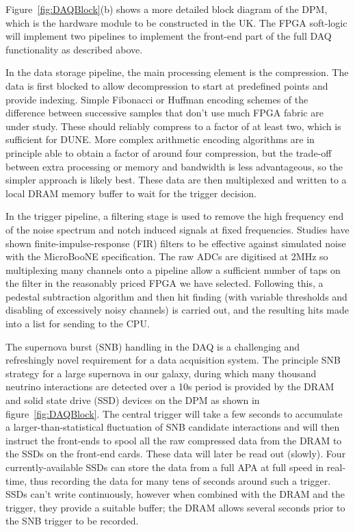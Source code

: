 Figure~\ref{fig:DAQBlock}(b) shows a more detailed block diagram of the
DPM, which is the hardware module to be constructed in the UK.  The FPGA 
soft-logic will implement two pipelines to implement the front-end part 
of the full DAQ functionality as described above.

In the data storage pipeline, the main processing element is the
compression.  The data is first blocked to allow decompression to
start at predefined points and provide indexing.  Simple Fibonacci or
Huffman encoding schemes of the difference between successive samples
that don't use much FPGA fabric are under study.  These should reliably
compress to a factor of at least two, which is sufficient for DUNE.
More complex arithmetic encoding algorithms are in principle able to
obtain a factor of around four compression, but the trade-off between
extra processing or memory and bandwidth is less advantageous, so the
simpler approach is likely best.
These data are then multiplexed and 
written to a local DRAM memory buffer to wait for the trigger decision. 

In the trigger pipeline, a filtering stage is used to remove the high
frequency end of the noise spectrum and notch induced signals at fixed
frequencies.  Studies have shown finite-impulse-response (FIR) filters
to be effective against simulated noise with the MicroBooNE
specification.  The raw ADCs are digitised at 2\/MHz so multiplexing
many channels onto a pipeline allow a sufficient number of taps on the
filter in the reasonably priced FPGA we have selected.  Following
this, a pedestal subtraction algorithm and then hit finding (with
variable thresholds and disabling of excessively noisy channels) is
carried out, and the resulting hits made into a list for sending to
the CPU.

The supernova burst (SNB) handling in the DAQ is a challenging and
refreshingly novel requirement for a data acquisition system.  The principle 
SNB strategy for a large supernova in our galaxy, during which many thousand 
neutrino interactions are detected over a 10\/s period is provided by the
DRAM and solid state drive (SSD) devices on the DPM as shown in 
figure~\ref{fig:DAQBlock}. The central trigger will take a few seconds to accumulate
a larger-than-statistical fluctuation of SNB candidate interactions and will then
instruct the front-ends to spool all the raw compressed data from the DRAM to 
the SSDs on the front-end cards.  These data will later be read out (slowly).  
Four currently-available SSDs can store the data from a full APA at full 
speed in real-time, thus recording the data for many tens of seconds around such 
a trigger.  SSDs can't write continuously, however when combined with the DRAM 
and the trigger, they provide a suitable buffer; the DRAM allows several seconds 
prior to the SNB trigger to be recorded.

